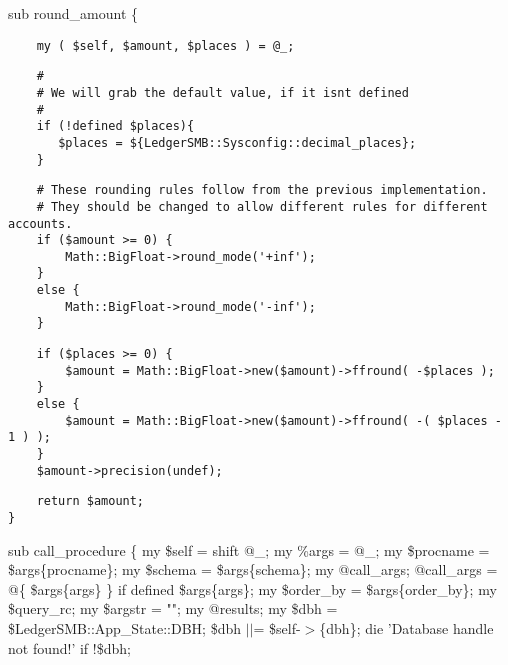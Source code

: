sub round\_amount \{

\begin{verbatim}
    my ( $self, $amount, $places ) = @_;
\end{verbatim}
\begin{verbatim}
    #
    # We will grab the default value, if it isnt defined
    #
    if (!defined $places){
       $places = ${LedgerSMB::Sysconfig::decimal_places};
    }
\end{verbatim}
\begin{verbatim}
    # These rounding rules follow from the previous implementation.
    # They should be changed to allow different rules for different accounts.
    if ($amount >= 0) {
        Math::BigFloat->round_mode('+inf');
    } 
    else {
        Math::BigFloat->round_mode('-inf');
    }
\end{verbatim}
\begin{verbatim}
    if ($places >= 0) {
        $amount = Math::BigFloat->new($amount)->ffround( -$places );
    } 
    else {
        $amount = Math::BigFloat->new($amount)->ffround( -( $places - 1 ) );
    } 
    $amount->precision(undef);
\end{verbatim}
\begin{verbatim}
    return $amount;
}
\end{verbatim}


sub call\_procedure \{
    my \$self     = shift @\_;
    my \%args     = @\_;
    my \$procname = \$args\{procname\};
    my \$schema   = \$args\{schema\};
    my @call\_args;
    @call\_args = @\{ \$args\{args\} \} if defined \$args\{args\};
    my \$order\_by = \$args\{order\_by\};
    my \$query\_rc;
    my \$argstr   = "";
    my @results;
    my \$dbh = \$LedgerSMB::App\_State::DBH;
    \$dbh $|$$|$= \$self-$>$\{dbh\};
    die 'Database handle not found!' if !\$dbh;

